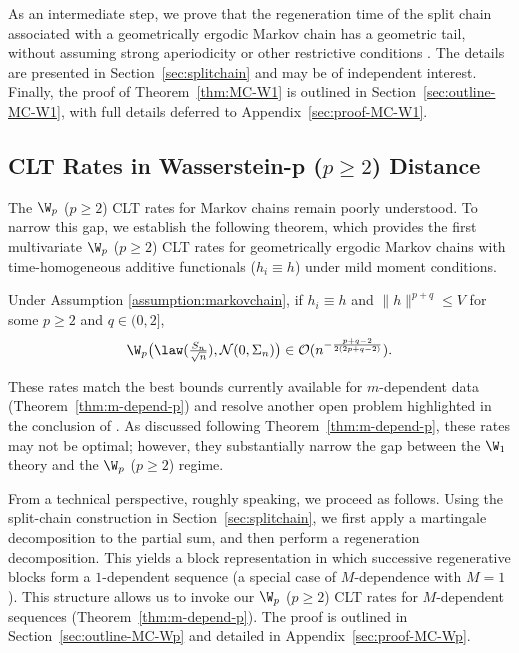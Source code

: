 \documentclass[mnsc,nonblindrev]{informs3}
\begin{document}
As an intermediate step, we prove that the regeneration time of the split chain
\citep{nummelin1978splitting} associated with a geometrically ergodic Markov chain
has a geometric tail, without assuming strong aperiodicity \citep{roberts1999bounds} or other restrictive
conditions \citep{rosenthal1995minorization}. The details are presented in Section~\ref{sec:splitchain} and may be
of independent interest.
Finally, the
proof of Theorem~\ref{thm:MC-W1} is outlined in Section~\ref{sec:outline-MC-W1},
with full details deferred to Appendix~\ref{sec:proof-MC-W1}.

\subsection{CLT Rates in Wasserstein-p ($p \geq 2$) Distance}
The  $\W_p$ ($p\ge 2$) CLT rates for Markov chains 
remain poorly understood. To narrow this gap, we establish the following
theorem, which provides the first multivariate $\W_p$ ($p\ge 2$) CLT rates for
geometrically ergodic Markov chains with time-homogeneous additive functionals ($h_i \equiv h$) under mild moment conditions.


\begin{theorem}
\label{thm:MC-Wp}
Under Assumption \ref{assumption:markovchain}, if $h_i \equiv h$ and $\|h\|^{p+q} \leq V$ for some $p \geq 2$ and $q \in (0,2]$,
    \begin{align*}
       \W_{p}\bigl(\law(\tfrac{S_n}{\sqrt{n}}),\mathcal N(0,\Sigma_n)\bigr) \in \mathcal{O}(n^{-\frac{p+q-2}{2(2p+q-2)}}) .
    \end{align*}
\end{theorem}
These rates match the best bounds currently available
for $m$-dependent data (Theorem~\ref{thm:m-depend-p}) and resolve another open
problem highlighted in the conclusion of \cite{srikant2024rates}. As discussed
following Theorem~\ref{thm:m-depend-p}, these rates may not be optimal; however,
they substantially narrow the gap between the $\W_1$ theory and the $\W_p$
($p\ge 2$) regime. 


From a technical perspective, roughly speaking, we proceed as follows. Using the
split-chain construction in Section~\ref{sec:splitchain}, we first apply a
martingale decomposition to the partial sum, and then perform a regeneration
decomposition. This yields a block representation in which successive
regenerative blocks form a $1$-dependent sequence (a special case of
$M$-dependence with $M=1$). This structure allows us to invoke our $\W_p$
($p\ge 2$) CLT rates for $M$-dependent sequences (Theorem~\ref{thm:m-depend-p}).
The proof is outlined in Section~\ref{sec:outline-MC-Wp} and detailed in
Appendix~\ref{sec:proof-MC-Wp}.
\end{document}
